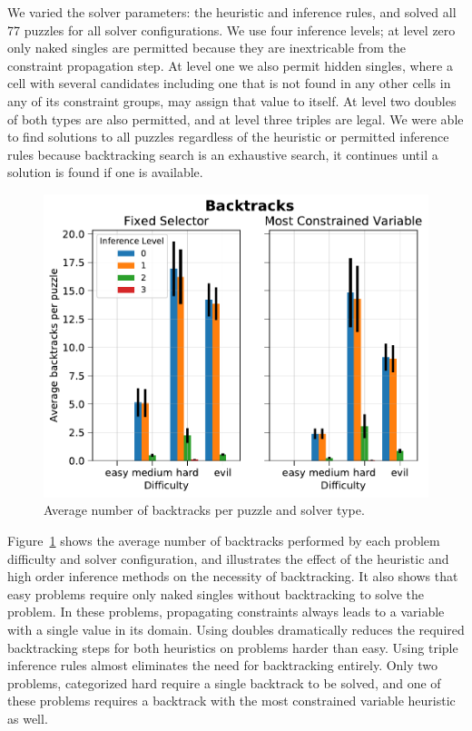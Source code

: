 \documentclass[12pt]{article}
\begin{document}
We varied the solver parameters: the heuristic and inference rules, and solved all 77 puzzles for all solver configurations.
We use four inference levels; at level zero only naked singles are permitted because they are inextricable from the constraint propagation step.
At level one we also permit hidden singles, where a cell with several candidates including one that is not found in any other cells in any of its constraint groups, may assign that value to itself.
At level two doubles of both types are also permitted, and at level three triples are legal.  
We were able to find solutions to all puzzles regardless of the heuristic or permitted inference rules because backtracking search is an exhaustive search, it continues until a solution is found if one is available.

\begin{figure}[!h]
	\centering
	\includegraphics[width=\textwidth]{BackPerform}
	\caption{Average number of backtracks per puzzle and solver type.}	
	\label{f:BackPerf}
\end{figure}

Figure~\ref{f:BackPerf} shows the average number of backtracks performed by each problem difficulty and solver configuration, and illustrates the effect of the heuristic and high order inference methods on the necessity of backtracking.
It also shows that easy problems require only naked singles without backtracking to solve the problem.
In these problems, propagating constraints always leads to a variable with a single value in its domain.
Using doubles dramatically reduces the required backtracking steps for both heuristics on problems harder than easy.
Using triple inference rules almost eliminates the need for backtracking entirely. 
Only two problems, categorized hard require a single backtrack to be solved, and one of these problems requires a backtrack with the most constrained variable heuristic as well.
\end{document}
